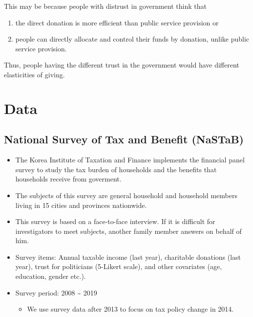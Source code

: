 \documentclass[ review  , 3p ]{elsarticle}
\providecommand{\tightlist}{%
  \setlength{\itemsep}{0pt}\setlength{\parskip}{0pt}}
\begin{document}
  This may be because people with distrust in government think that

  \begin{enumerate}
  \def\labelenumi{\arabic{enumi}.}
  \tightlist
  \item
    the direct donation is more efficient than public service provision or
  \item
    people can directly allocate and control their funds by donation, unlike public service provision.
  \end{enumerate}

  Thus, people having the different trust in the government would have different elasticities of giving.

  \hypertarget{data}{%
  \section{Data}\label{data}}

  \hypertarget{national-survey-of-tax-and-benefit-nastab}{%
  \subsection{National Survey of Tax and Benefit (NaSTaB)}\label{national-survey-of-tax-and-benefit-nastab}}

  \begin{itemize}
  \tightlist
  \item
    The Korea Institute of Taxation and Finance implements the financial panel survey to study the tax burden of households and the benefits that households receive from goverment.
  \item
    The subjects of this survey are general household and household members living in 15 cities and provinces nationwide.
  \item
    This survey is based on a face-to-face interview. If it is difficult for investigators to meet subjects, another family member answers on behalf of him.
  \item
    Survey items: Annual taxable income (last year), charitable donations (last year), trust for politicians (5-Likert scale), and other covariates (age, education, gender etc.).
  \item
    Survey period: 2008 \textasciitilde{} 2019

    \begin{itemize}
    \tightlist
    \item
      We use survey data after 2013 to focus on tax policy change in 2014.
    \end{itemize}
  \end{itemize}
\end{document}
